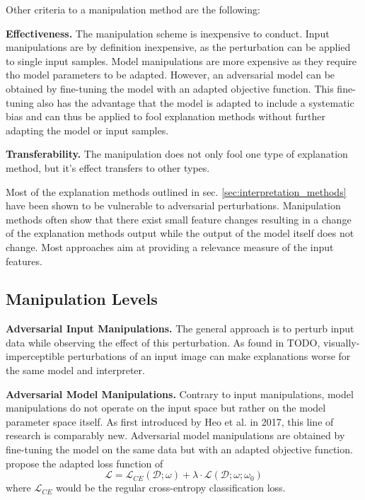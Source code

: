 Other criteria to a manipulation method are the following:

\noindent\textbf{Effectiveness.} The manipulation scheme is inexpensive to conduct. Input manipulations are by definition inexpensive, as the perturbation can be applied to single input samples. Model manipulations are more expensive as they require tho model parameters to be adapted. However, an adversarial model can be obtained by fine-tuning the model with an adapted objective function. This fine-tuning also has the advantage that the model is adapted to include a systematic bias and can thus be applied to fool explanation methods without further adapting the model or input samples.

\noindent\textbf{Transferability.} The manipulation does not only fool one type of explanation method, but it's effect transfers to other types. 



Most of the explanation methods outlined in sec. \autoref{sec:interpretation_methods} have been shown to be vulnerable to adversarial perturbations. 
Manipulation methods often show that there exist small feature changes resulting in a change of the explanation methods output while the output of the model itself does not change. 
Most approaches aim at providing a relevance measure of the input features. \\



\subsection{Manipulation Levels}
\label{subsec:manipulation_levels}

\noindent\textbf{Adversarial Input Manipulations.} The general approach is to perturb input data while observing the effect of this perturbation. As found in TODO, visually-imperceptible perturbations of an input image can make explanations worse for the same model and interpreter. 


\noindent\textbf{Adversarial Model Manipulations.} 
Contrary to input manipulations, model manipulations do not operate on the input space but rather on the model parameter space itself. 
As first introduced by Heo et al. \cite{fooling_nn_interpreters} in 2017, this line of research is comparably new. 
Adversarial model manipulations are obtained by fine-tuning the model on the same data but with an adapted objective function. \cite{fooling_nn_interpreters} propose the adapted loss function of $$ \mathcal{L} = \mathcal{L}_{CE}(\mathcal{D};\omega) + \lambda \cdot \mathcal{L}(\mathcal{D};\omega; \omega_0) $$ where $\mathcal{L}_{CE}$ would be the regular cross-entropy classification loss. 

